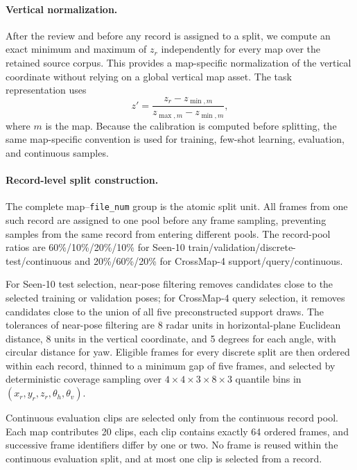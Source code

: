 \paragraph{Vertical normalization.}
After the review and before any record is assigned to a split, we compute an exact minimum and maximum of $z_r$ independently for every map over the retained source corpus. This provides a map-specific normalization of the vertical coordinate without relying on a global vertical map asset.
The task representation uses
\begin{equation}
    z' = \frac{z_r-z_{\min,m}}{z_{\max,m}-z_{\min,m}},
\end{equation}
where $m$ is the map. Because the calibration is computed before splitting, the same map-specific convention is used for training, few-shot learning, evaluation, and continuous samples.

\paragraph{Record-level split construction.}
The complete map--\texttt{file\_num} group is the atomic split unit.
All frames from one such record are assigned to one pool before any frame sampling, preventing samples from the same record from entering different pools.
The record-pool ratios are 60\%/10\%/20\%/10\% for Seen-10 train/validation/discrete-test/continuous and 20\%/60\%/20\% for CrossMap-4 support/query/continuous.

For Seen-10 test selection, near-pose filtering removes candidates close to the selected training or validation poses; for CrossMap-4 query selection, it removes candidates close to the union of all five preconstructed support draws. The tolerances of near-pose filtering are 8 radar units in horizontal-plane Euclidean distance, 8 units in the vertical coordinate, and 5 degrees for each angle, with circular distance for yaw.
Eligible frames for every discrete split are then ordered within each record, thinned to a minimum gap of five frames, and selected by deterministic coverage sampling over $4\times4\times3\times8\times3$ quantile bins in $(x_r,y_r,z_r,\theta_h,\theta_v)$.

Continuous evaluation clips are selected only from the continuous record pool.
Each map contributes 20 clips, each clip contains exactly 64 ordered frames, and successive frame identifiers differ by one or two.
No frame is reused within the continuous evaluation split, and at most one clip is selected from a record.


